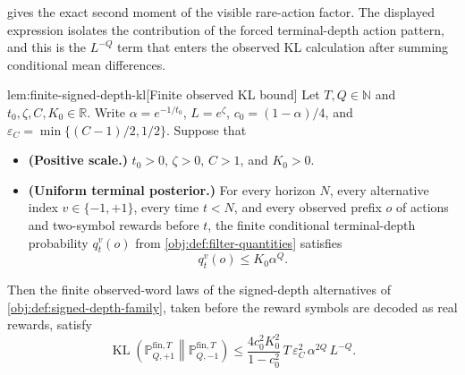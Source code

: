 \documentclass[11pt]{article}
\begin{document}
 gives the exact second moment of the visible rare-action factor. The displayed expression isolates the contribution of the forced terminal-depth action pattern, and this is the \(L^{-Q}\) term that enters the observed KL calculation after summing conditional mean differences.

\begin{lemmav}{lem:finite-signed-depth-kl}[Finite observed KL bound]
Let \(T,Q\in\mathbb N\) and \(t_0,\zeta,C,K_0\in\mathbb R\).  Write \(\alpha=e^{-1/t_0}\), \(L=e^\zeta\), \(c_0=(1-\alpha)/4\), and \(\varepsilon_C=\min\{(C-1)/2,1/2\}\).  Suppose that
\begin{itemize}
\item \textbf{(Positive scale.)} \(t_0>0\), \(\zeta>0\), \(C>1\), and \(K_0>0\).
\item \textbf{(Uniform terminal posterior.)} For every horizon \(N\), every alternative index \(v\in\{-1,+1\}\), every time \(t<N\), and every observed prefix \(o\) of actions and two-symbol rewards before \(t\), the finite conditional terminal-depth probability \(q_t^v(o)\) from \cref{obj:def:filter-quantities} satisfies
\[
q_t^v(o)\le K_0\alpha^Q .
\]
\end{itemize}
Then the finite observed-word laws of the signed-depth alternatives of \cref{obj:def:signed-depth-family}, taken before the reward symbols are decoded as real rewards, satisfy
\[
\operatorname{KL}\!\left(\mathbb P_{Q,+1}^{\mathrm{fin},T}\middle\|\mathbb P_{Q,-1}^{\mathrm{fin},T}\right)
\le
\frac{4c_0^2K_0^2}{1-c_0^2}\,
T\,\varepsilon_C^2\,\alpha^{2Q}\,L^{-Q}.
\]
\end{lemmav}
\end{document}

